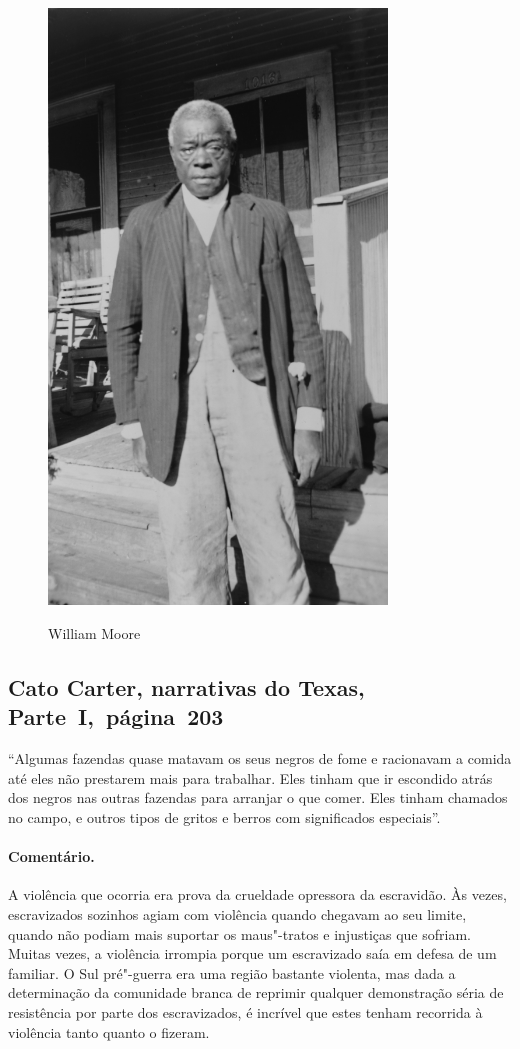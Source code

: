 \begin{figure}[]
\centering
 \includegraphics[width=90mm]{./imgs/williammoore_recorte.jpg} \label{img19}
\caption{William Moore}
\end{figure}

\subsection{Cato Carter, narrativas do Texas, Parte~I,~página~203} \label{ref53}

``Algumas fazendas quase matavam os seus negros de fome e racionavam a
comida até eles não prestarem mais para trabalhar. Eles tinham que ir
escondido atrás dos negros nas outras fazendas para arranjar o que
comer. Eles tinham chamados no campo, e outros tipos de gritos e berros
com significados especiais''.

\paragraph{Comentário.}\quad
{\small
A violência que ocorria era prova da crueldade opressora da
escravidão. Às vezes, escravizados sozinhos agiam com violência quando
chegavam ao seu limite, quando não podiam mais suportar os maus"-tratos e
injustiças que sofriam. Muitas vezes, a violência irrompia porque um
escravizado saía em defesa de um familiar. O Sul pré"-guerra era uma região
bastante violenta, mas dada a determinação da comunidade branca de
reprimir qualquer demonstração séria de resistência por parte dos
escravizados, é incrível que estes tenham recorrida à violência tanto quanto
o fizeram.
}

